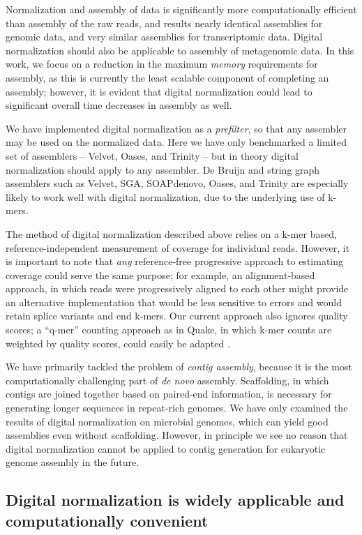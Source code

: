 \documentclass[10pt]{article}
\begin{document}
Normalization and assembly of data is significantly more
computationally efficient than assembly of the raw reads, and results
nearly identical assemblies for genomic data, and very similar
assemblies for transcriptomic data.  Digital normalization should also
be applicable to assembly of metagenomic data.  In this work, we focus
on a reduction in the maximum {\em memory} requirements for assembly,
as this is currently the least scalable component of completing an
assembly; however, it is evident that digital normalization could lead
to significant overall time decreases in assembly as well.

We have implemented digital normalization as a {\em prefilter}, so
that any assembler may be used on the normalized data.  Here we have
only benchmarked a limited set of assemblers -- Velvet, Oases, and
Trinity -- but in theory digital normalization should apply to any
assembler.  De Bruijn and string graph assemblers such as Velvet, SGA,
SOAPdenovo, Oases, and Trinity are especially likely to work well with
digital normalization, due to the underlying use of k-mers.

The method of digital normalization described above relies on a k-mer
based, reference-independent measurement of coverage for individual
reads.  However, it is important to note that {\em any} reference-free
progressive approach to estimating coverage could serve the same
purpose; for example, an alignment-based approach, in which reads were
progressively aligned to each other might provide an alternative
implementation that would be less sensitive to errors and would retain
splice variants and end k-mers.  Our current approach also ignores
quality scores; a ``q-mer'' counting approach as in Quake, in which
k-mer counts are weighted by quality scores, could easily be adapted
\cite{pubmed21114842}.

We have primarily tackled the problem of {\em contig assembly},
because it is the most computationally challenging part of {\em de
  novo} assembly.  Scaffolding, in which contigs are joined together
based on paired-end information, is necessary for generating longer
sequences in repeat-rich genomes.  We have only examined the results
of digital normalization on microbial genomes, which can yield good
assemblies even without scaffolding.  However, in principle we see no
reason that digital normalization cannot be applied to contig
generation for eukaryotic genome assembly in the future.

\subsection*{Digital normalization is widely applicable and computationally convenient}
\end{document}
